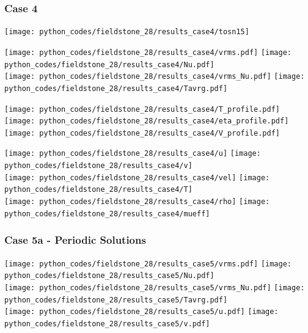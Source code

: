 \newpage %
\subsubsection*{Case 4}

\texttt{[image: python\_codes/fieldstone\_28/results\_case4/tosn15]}

\begin{center}
\texttt{[image: python\_codes/fieldstone\_28/results\_case4/vrms.pdf]}
\texttt{[image: python\_codes/fieldstone\_28/results\_case4/Nu.pdf]}\\
\texttt{[image: python\_codes/fieldstone\_28/results\_case4/vrms\_Nu.pdf]}
\texttt{[image: python\_codes/fieldstone\_28/results\_case4/Tavrg.pdf]}
\end{center}

\begin{center}
\texttt{[image: python\_codes/fieldstone\_28/results\_case4/T\_profile.pdf]}
\texttt{[image: python\_codes/fieldstone\_28/results\_case4/eta\_profile.pdf]}
\texttt{[image: python\_codes/fieldstone\_28/results\_case4/V\_profile.pdf]}
\end{center}

\newpage
\begin{center}
\texttt{[image: python\_codes/fieldstone\_28/results\_case4/u]}
\texttt{[image: python\_codes/fieldstone\_28/results\_case4/v]}\\
\texttt{[image: python\_codes/fieldstone\_28/results\_case4/vel]}
\texttt{[image: python\_codes/fieldstone\_28/results\_case4/T]}\\
\texttt{[image: python\_codes/fieldstone\_28/results\_case4/rho]}
\texttt{[image: python\_codes/fieldstone\_28/results\_case4/mueff]}
\end{center}

\newpage %
\subsubsection*{Case 5a - Periodic Solutions}

\begin{center}
\texttt{[image: python\_codes/fieldstone\_28/results\_case5/vrms.pdf]}
\texttt{[image: python\_codes/fieldstone\_28/results\_case5/Nu.pdf]}\\
\texttt{[image: python\_codes/fieldstone\_28/results\_case5/vrms\_Nu.pdf]}
\texttt{[image: python\_codes/fieldstone\_28/results\_case5/Tavrg.pdf]}\\
\texttt{[image: python\_codes/fieldstone\_28/results\_case5/u.pdf]}
\texttt{[image: python\_codes/fieldstone\_28/results\_case5/v.pdf]}
\end{center}


